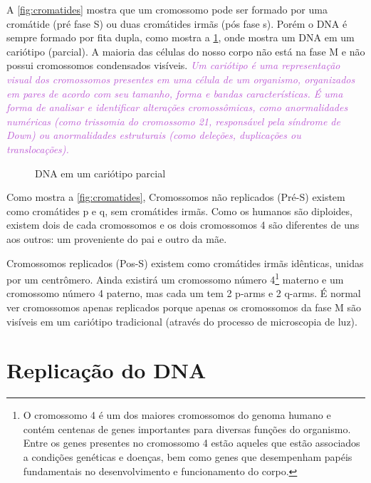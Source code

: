 \documentclass[11pt,a4paper]{article}
\begin{document}
	A \ref{fig:cromatides} mostra que um cromossomo pode ser formado por uma cromátide (pré fase S) ou duas cromátides irmãs (pós fase s). Porém o DNA é sempre formado por fita dupla, como mostra a \ref{fig:karyotype}, onde mostra um DNA em um cariótipo (parcial). A maioria das células do nosso corpo não está na fase M e não possui cromossomos condensados visíveis. \textit{\textcolor{MediumOrchid}{Um cariótipo é uma representação visual dos cromossomos presentes em uma célula de um organismo, organizados em pares de acordo com seu tamanho, forma e bandas características. É uma forma de analisar e identificar alterações cromossômicas, como anormalidades numéricas (como trissomia do cromossomo 21, responsável pela síndrome de Down) ou anormalidades estruturais (como deleções, duplicações ou translocações).}} 
    
	\begin{figure}
		\centering
		\caption{DNA em um cariótipo parcial}
		\label{fig:karyotype}
	\end{figure}
  
    Como mostra a \ref{fig:cromatides}, Cromossomos não replicados (Pré-S) existem como cromátides p e q, sem cromátides irmãs. Como os humanos são diploides, existem dois de cada cromossomos e os dois cromossomos 4 são diferentes de uns aos outros: um proveniente do pai e outro da mãe. 

    Cromossomos replicados (Pos-S) existem como cromátides irmãs idênticas, unidas por um centrômero. Ainda existirá um cromossomo número 4\footnote{O cromossomo 4 é um dos maiores cromossomos do genoma humano e contém centenas de genes importantes para diversas funções do organismo. Entre os genes presentes no cromossomo 4 estão aqueles que estão associados a condições genéticas e doenças, bem como genes que desempenham papéis fundamentais no desenvolvimento e funcionamento do corpo.} materno e um cromossomo número 4 paterno, mas cada um tem 2 p-arms e 2 q-arms. É normal ver cromossomos apenas replicados porque apenas os cromossomos da fase M são visíveis em um cariótipo tradicional (através do processo de microscopia de luz).

	\section{Replicação do DNA}
\end{document}

